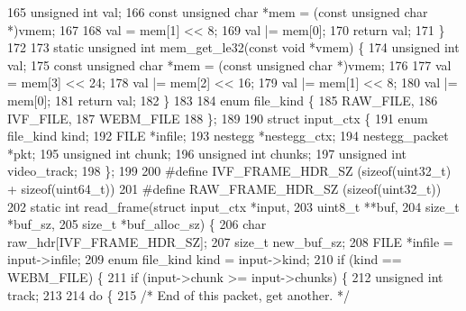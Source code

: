 \begin{DoxyCodeInclude}
{{{{{165   \textcolor{keywordtype}{unsigned} \textcolor{keywordtype}{int}  val;
166   \textcolor{keyword}{const} \textcolor{keywordtype}{unsigned} \textcolor{keywordtype}{char} *mem = (\textcolor{keyword}{const} \textcolor{keywordtype}{unsigned} \textcolor{keywordtype}{char} *)vmem;
167 
168   val = mem[1] << 8;
169   val |= mem[0];
170   \textcolor{keywordflow}{return} val;
171 \}
172 
173 \textcolor{keyword}{static} \textcolor{keywordtype}{unsigned} \textcolor{keywordtype}{int} mem\_get\_le32(\textcolor{keyword}{const} \textcolor{keywordtype}{void} *vmem) \{
174   \textcolor{keywordtype}{unsigned} \textcolor{keywordtype}{int}  val;
175   \textcolor{keyword}{const} \textcolor{keywordtype}{unsigned} \textcolor{keywordtype}{char} *mem = (\textcolor{keyword}{const} \textcolor{keywordtype}{unsigned} \textcolor{keywordtype}{char} *)vmem;
176 
177   val = mem[3] << 24;
178   val |= mem[2] << 16;
179   val |= mem[1] << 8;
180   val |= mem[0];
181   \textcolor{keywordflow}{return} val;
182 \}
183 
184 \textcolor{keyword}{enum} file\_kind \{
185   RAW\_FILE,
186   IVF\_FILE,
187   WEBM\_FILE
188 \};
189 
190 \textcolor{keyword}{struct }input\_ctx \{
191   \textcolor{keyword}{enum} file\_kind  kind;
192   FILE           *infile;
193   nestegg        *nestegg\_ctx;
194   nestegg\_packet *pkt;
195   \textcolor{keywordtype}{unsigned} \textcolor{keywordtype}{int}    chunk;
196   \textcolor{keywordtype}{unsigned} \textcolor{keywordtype}{int}    chunks;
197   \textcolor{keywordtype}{unsigned} \textcolor{keywordtype}{int}    video\_track;
198 \};
199 
200 \textcolor{preprocessor}{#define IVF\_FRAME\_HDR\_SZ (sizeof(uint32\_t) + sizeof(uint64\_t))}
201 \textcolor{preprocessor}{#define RAW\_FRAME\_HDR\_SZ (sizeof(uint32\_t))}
202 \textcolor{keyword}{static} \textcolor{keywordtype}{int} read\_frame(\textcolor{keyword}{struct} input\_ctx      *input,
203                       uint8\_t               **buf,
204                       \textcolor{keywordtype}{size\_t}                *buf\_sz,
205                       \textcolor{keywordtype}{size\_t}                *buf\_alloc\_sz) \{
206   \textcolor{keywordtype}{char}            raw\_hdr[IVF\_FRAME\_HDR\_SZ];
207   \textcolor{keywordtype}{size\_t}          new\_buf\_sz;
208   FILE           *infile = input->infile;
209   \textcolor{keyword}{enum} file\_kind  kind = input->kind;
210   \textcolor{keywordflow}{if} (kind == WEBM\_FILE) \{
211     \textcolor{keywordflow}{if} (input->chunk >= input->chunks) \{
212       \textcolor{keywordtype}{unsigned} \textcolor{keywordtype}{int} track;
213 
214       \textcolor{keywordflow}{do} \{
215         \textcolor{comment}{/* End of this packet, get another. */}
}}}}}
\end{DoxyCodeInclude}
